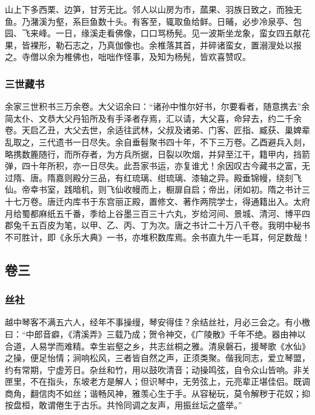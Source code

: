 \documentclass[]{article}
\begin{document}
山上下多西栗、边笋，甘芳无比。邻人以山房为市，蓏果、羽族日致之，而独无鱼。乃潴溪为壑，系巨鱼数十头。有客至，辄取鱼给鲜。日晡，必步冷泉亭、包园、飞来峰。一日，缘溪走看佛像，口口骂杨髡。见一波斯坐龙象，蛮女四五献花果，皆裸形，勒石志之，乃真伽像也。余椎落其首，并碎诸蛮女，置溺溲处以报之。寺僧以余为椎佛也，咄咄作怪事，及知为杨髡，皆欢喜赞叹。

\hypertarget{header-n180}{%
\subsubsection{三世藏书}\label{header-n180}}

余家三世积书三万余卷。大父诏余曰：``诸孙中惟尔好书，尔要看者，随意携去''余简太仆、文恭大父丹铅所及有手泽者存焉，汇以请，大父喜，命舁去，约二千余卷。天启乙丑，大父去世，余适往武林，父叔及诸弟、门客、匠指、臧获、巢婢辈乱取之，三代遗书一日尽失。余自垂髫聚书四十年，不下三万卷。乙酉避兵入剡，略携数簏随行，而所存者，为方兵所据，日裂以吹烟，并舁至江干，籍甲内，挡箭弹，四十年所积，亦一日尽失。此吾家书运，亦复谁尤！余因叹古今藏书之富，无过隋、唐。隋嘉则殿分三品，有红琉璃、绀琉璃、漆轴之异。殿垂锦幔，绕刻飞仙。帝幸书室，践暗机，则飞仙收幔而上，橱扉自启；帝出，闭如初。隋之书计三十七万卷。唐迁内库书于东宫丽正殿，置修文、著作两院学士，得通籍出入。太府月给蜀都麻纸五千番，季给上谷墨三百三十六丸，岁给河间、景城、清河、博平四郡兔千五百皮为笔，以甲、乙、丙、丁为次。唐之书计二十万八千卷。我明中秘书不可胜计，即《永乐大典》一书，亦堆积数库焉。余书直九牛一毛耳，何足数哉！

\hypertarget{header-n184}{%
\subsection{卷三}\label{header-n184}}

\hypertarget{header-n186}{%
\subsubsection{丝社}\label{header-n186}}

越中琴客不满五六人，经年不事操缦，琴安得佳？余结丝社，月必三会之。有小檄曰：``中郎音癖，《清溪弄》三载乃成；贺令神交，《广陵散》千年不绝。器由神以合道，人易学而难精。幸生岩壑之乡，共志丝桐之雅。清泉磐石，援琴歌《水仙》之操，便足怡情；涧响松风，三者皆自然之声，正须类聚。偕我同志，爱立琴盟，约有常期，宁虚芳日。杂丝和竹，用以鼓吹清音；动操鸣弦，自令众山皆响。非关匣里，不在指头，东坡老方是解人；但识琴中，无劳弦上，元亮辈正堪佳侣。既调商角，翻信肉不如丝；谐畅风神，雅羡心生于手。从容秘玩，莫令解秽于花奴；抑按盘桓，敢谓倦生于古乐。共怜同调之友声，用振丝坛之盛举。''
\end{document}

